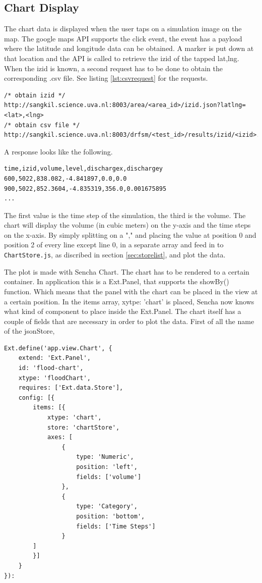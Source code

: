\subsection{Chart Display}
The chart data is displayed when the user taps on a simulation image on the map. The google maps API supports the click event, the event has a payload where the latitude and longitude data can be obtained. A marker is put down at that location and the API is called to retrieve the izid of the tapped lat,lng. When the izid is known, a second request has to be done to obtain the corresponding .csv file. See listing \ref{lst:csvrequest} for the requests.

\begin{lstlisting}[caption={requests for flood data}, label={lst:csvrequests}]
/* obtain izid */
http://sangkil.science.uva.nl:8003/area/<area_id>/izid.json?latlng=<lat>,<lng> 
/* obtain csv file */
http://sangkil.science.uva.nl:8003/drfsm/<test_id>/results/izid/<izid>.csv 
\end{lstlisting}
 
A response looks like the following.
\begin{lstlisting}[caption={csv response}, label={lst:csvresponse}]
time,izid,volume,level,dischargex,dischargey
600,5022,838.082,-4.841897,0.0,0.0
900,5022,852.3604,-4.835319,356.0,0.001675895
...
\end{lstlisting}
The first value is the time step of the simulation, the third is the volume. The chart will display the volume (in cubic meters) on the y-axis and the time steps on the x-axis. By simply splitting on a "," and placing the value at position 0 and position 2 of every line except line 0, in a separate array and feed in to \texttt{ChartStore.js}, as discribed in section \ref{sec:storelist}, and plot the data.

The plot is made with Sencha Chart. The chart has to be rendered to a certain container. In application this is a Ext.Panel, that supports the showBy() function. Which means that the panel with the chart can be placed in the view at a certain position. In the items array, xytpe: 'chart' is placed, Sencha now knows what kind of component to place inside the Ext.Panel. The chart itself has a couple of fields that are necessary in order to plot the data. First of all the name of the jsonStore,


\begin{lstlisting}[caption=Chart component app/view/Chart.js, label="chartcomponent" ]
Ext.define('app.view.Chart', {
	extend: 'Ext.Panel',
    id: 'flood-chart',
	xtype: 'floodChart',
    requires: ['Ext.data.Store'],
    config: [{
    	items: [{
			xtype: 'chart',
			store: 'chartStore',
			axes: [
				{
					type: 'Numeric',
					position: 'left',
					fields: ['volume']
				},
				{
					type: 'Category',
					position: 'bottom',
					fields: ['Time Steps']
				}			
		]
    	}]
    }
}):
\end{lstlisting}

